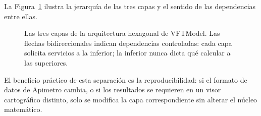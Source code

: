 La Figura~\ref{fig:vft-arquitectura} ilustra la jerarquía de las tres capas y
el sentido de las dependencias entre ellas.

\begin{figure}[H]
    \centering
    \DIFdelbeginFL %
\DIFdelendFL \DIFaddbeginFL {}
    \DIFaddendFL \caption[Arquitectura hexagonal de VFTModel]{Las tres capas de la arquitectura
    hexagonal de VFTModel. Las flechas bidireccionales indican dependencias
    controladas: cada capa solicita servicios a la inferior; la inferior nunca
    dicta qué calcular a las superiores.}
    \label{fig:vft-arquitectura}
\end{figure}

El beneficio práctico de esta separación es la reproducibilidad: si el formato
de datos de Apimetro cambia, o si los resultados se requieren en un visor
cartográfico distinto, solo se modifica la capa correspondiente sin alterar el
núcleo matemático.

